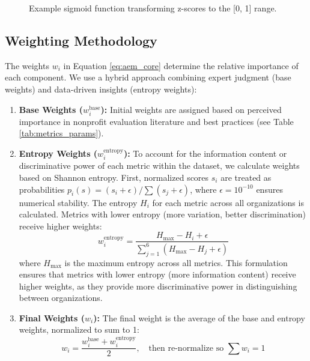 \documentclass[12pt]{article}
\begin{document}
\begin{figure}[H] %
\centering
{}
\caption{Example sigmoid function transforming z-scores to the [0, 1] range.}
\label{fig:sigmoid_example}
\end{figure}


\subsection{Weighting Methodology} %
The weights $w_i$ in Equation \ref{eq:aem_core} determine the relative importance of each component. We use a hybrid approach combining expert judgment (base weights) and data-driven insights (entropy weights):
\begin{enumerate}
    \item \textbf{Base Weights ($w_i^{\text{base}}$):} Initial weights are assigned based on perceived importance in nonprofit evaluation literature and best practices (see Table \ref{tab:metrics_params}).
    
    \item \textbf{Entropy Weights ($w_i^{\text{entropy}}$):} To account for the information content or discriminative power of each metric within the dataset, we calculate weights based on Shannon entropy. First, normalized scores $s_i$ are treated as probabilities $p_i(s) = (s_i + \epsilon) / \sum (s_j + \epsilon)$, where $\epsilon=10^{-10}$ ensures numerical stability. The entropy $H_i$ for each metric across all organizations is calculated. Metrics with lower entropy (more variation, better discrimination) receive higher weights:
    \begin{equation} \label{eq:entropy_weight}
        w_i^{\text{entropy}} = \frac{H_{\max} - H_i + \epsilon}{\sum_{j=1}^{6} (H_{\max} - H_j + \epsilon)}
    \end{equation}
    where $H_{\max}$ is the maximum entropy across all metrics. This formulation ensures that metrics with lower entropy (more information content) receive higher weights, as they provide more discriminative power in distinguishing between organizations.

    \item \textbf{Final Weights ($w_i$):} The final weight is the average of the base and entropy weights, normalized to sum to 1:
    \begin{equation} \label{eq:final_weight}
        w_i = \frac{w_i^{\text{base}} + w_i^{\text{entropy}}}{2}, \quad \text{then re-normalize so } \sum w_i = 1
    \end{equation}
\end{enumerate}
\end{document}
